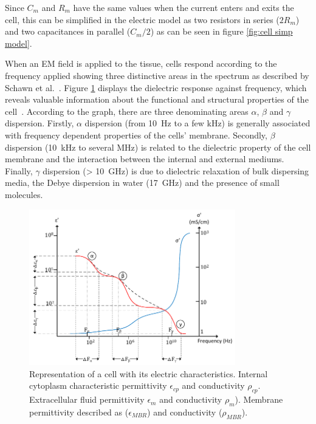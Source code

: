 Since $C_m$ and $R_m$ have the same values when the current enters and exits the cell, this can be simplified in the electric model as two resistors in series ($2R_m$) and two capacitances in parallel ($C_m/2$) as can be seen in figure \ref{fig:cell simp model}.

When an EM field is applied to the tissue, cells respond according to the frequency applied showing three distinctive areas in the spectrum as described by Schawn et al.~\cite{schwan1957electrical,schwan1962electrical}. Figure \ref{fig:ABG dispersion} displays the dielectric response against frequency, which reveals valuable information about the functional and structural properties of the cell~\cite{lvovich2012impedance}. According to the graph, there are three denominating areas $\alpha$, $\beta$ and $\gamma$ dispersion. Firstly, $\alpha$ dispersion (from \SI{10}{\hertz} to a few \si{\kilo\hertz}) is generally associated with frequency dependent properties of the cells’ membrane. Secondly, $\beta$ dispersion (\SI{10}{\kilo\hertz} to several \si{\mega\hertz}) is related to the dielectric property of the cell membrane and the interaction between the internal and external mediums. Finally, $\gamma$ dispersion (> \SI{10}{\giga\hertz}) is due to dielectric relaxation of bulk dispersing media, the Debye dispersion in water (\SI{17}{\giga\hertz}) and the presence of small molecules. 

\begin{figure}[!htpb]
	\centering
	\includegraphics[width=0.8\textwidth,keepaspectratio, trim={0cm 1cm 0cm 0cm},clip]{figure3}    
	\caption[Alpha, Bet y Gama dispersion]{Representation of a cell with its electric characteristics. Internal cytoplasm characteristic permittivity $\epsilon_{cp}$ and conductivity $\rho_{cp}$. Extracellular fluid permittivity $\epsilon_m$ and conductivity $\rho_m$). Membrane permittivity described as ($\epsilon_{MBR}$) and conductivity ($\rho_{MBR}$).}
	\label{fig:ABG dispersion}
\end{figure}

